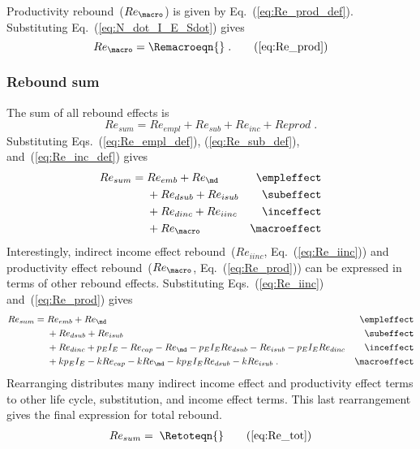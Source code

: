\subsubsection{\Macroeffect{}} 
\label{sec:Re_prod}

Productivity rebound~($Re_{\macro}$) is given by Eq.~(\ref{eq:Re_prod_def}).
Substituting Eq.~(\ref{eq:N_dot_I_E_Sdot}) gives
%
\begin{equation}
  Re_{\macro} = \Remacroeqn{} \; . \tag{\ref{eq:Re_prod}}
\end{equation}


\subsubsection{Rebound sum} 
\label{sec:total_rebound}

The sum of all rebound effects is 
%
\begin{equation}
  Re_{sum} = Re_{empl} + Re_{sub} + Re_{inc} + Re{prod} \; .
\end{equation}
%
Substituting Eqs.~(\ref{eq:Re_empl_def}), (\ref{eq:Re_sub_def}), and~(\ref{eq:Re_inc_def}) gives
%
\begin{align}
  Re_{sum} = \; &Re_{emb} + Re_{\md}      & \mathrm{\empleffect} \nonumber \\
                &+ Re_{dsub} + Re_{isub}   & \mathrm{\subeffect}  \nonumber \\
                &+ Re_{dinc} + Re_{iinc}   & \mathrm{\inceffect}  \nonumber \\
                &+ Re_{\macro}               & \mathrm{\macroeffect}
\end{align}
%
Interestingly, 
indirect income effect rebound~($Re_{iinc}$, Eq.~(\ref{eq:Re_iinc})) and
productivity effect rebound~($Re_{\macro}$, Eq.~(\ref{eq:Re_prod}))
can be expressed in terms of other rebound effects.
Substituting Eqs.~(\ref{eq:Re_iinc}) and~(\ref{eq:Re_prod}) gives
%
\begin{align}
  Re_{sum} = \; &Re_{emb} + Re_{\md}      & \mathrm{\empleffect}                           \nonumber \\
                &+ Re_{dsub} + Re_{isub}   & \mathrm{\subeffect}                            \nonumber \\
                &+ Re_{dinc} + p_E I_E - Re_{cap} - Re_{\md} - p_E I_E Re_{dsub} 
                             - Re_{isub} - p_E I_E Re_{dinc}   & \mathrm{\inceffect}        \nonumber \\
                &+ k p_E I_E - k Re_{cap} - k Re_{\md} - k p_E I_E Re_{dsub} - k Re_{isub} \; .  & \mathrm{\macroeffect}
\end{align}
%
Rearranging distributes many indirect income effect and productivity effect terms 
to other life cycle, substitution, and income effect terms.
This last rearrangement gives the final expression for total rebound.
%
\begin{align}
  Re_{sum} = \; \Retoteqn{} \tag{\ref{eq:Re_tot}}
\end{align}

